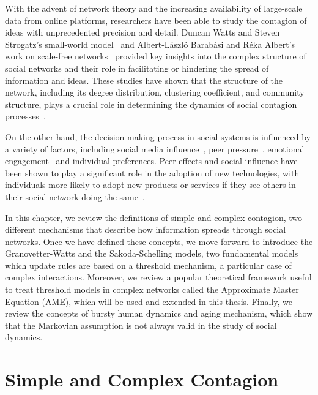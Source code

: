 With the advent of network theory and the increasing availability of large-scale data from online platforms, researchers have been able to study the contagion of ideas with unprecedented precision and detail. Duncan Watts and Steven Strogatz's small-world model~\cite{watts1998collective} and Albert-László Barabási and Réka Albert's work on scale-free networks~\cite{barabasi2009scale} provided key insights into the complex structure of social networks and their role in facilitating or hindering the spread of information and ideas. These studies have shown that the structure of the network, including its degree distribution, clustering coefficient, and community structure, plays a crucial role in determining the dynamics of social contagion processes~\cite{newman2002spread, pastor-satorras-2015}.

On the other hand, the decision-making process in social systems is influenced by a variety of factors, including social media influence~\cite{online-platforms, jstor}, peer pressure~\cite{jensen-2015}, emotional engagement~\cite{ferrara-2015, steinert-2022} and individual preferences. Peer effects and social influence have been shown to play a significant role in the adoption of new technologies, with individuals more likely to adopt new products or services if they see others in their social network doing the same~\cite{rogers2014, valente-1996, bollinger-2012}.

In this chapter, we review the definitions of simple and complex contagion, two different mechanisms that describe how information spreads through social networks. Once we have defined these concepts, we move forward to introduce the Granovetter-Watts and the Sakoda-Schelling models, two fundamental models which update rules are based on a threshold mechanism, a particular case of complex interactions. Moreover, we review a popular theoretical framework useful to treat threshold models in complex networks called the Approximate Master Equation (AME), which will be used and extended in this thesis. Finally, we review the concepts of bursty human dynamics and aging mechanism, which show that the Markovian assumption is not always valid in the study of social dynamics.

\section{\label{sec:Simple and Complex Contagion} Simple and Complex Contagion}

